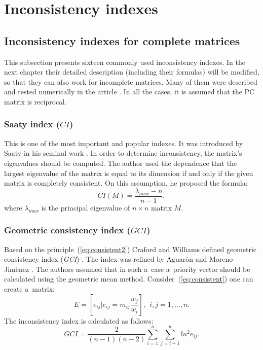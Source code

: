 \chapter{Inconsistency indexes}
\label{sec:inconsistencyIndexes}
\section{Inconsistency indexes for complete matrices}

This subsection presents sixteen commonly used inconsistency indexes. In the next chapter their detailed description (including their formulas) will be modified, so that they can also work for incomplete matrices. Many of them were described and tested numerically in the article \cite{Brunelli2013}. In all the cases, it is assumed that the PC matrix is reciprocal.


 \subsection{Saaty index ($\textit{CI}$)}

This is one of the most important and popular indexes. It was introduced by Saaty in his seminal work \cite{SAATY1977}. In order to determine inconsistency, the matrix's eigenvalues should be computed. The author used the dependence that the largest eigenvalue of the matrix is equal to its dimension if and only if the given matrix is completely consistent. On this assumption, he proposed the formula:
	\begin{equation} 
		CI(M)=\frac{\lambda_{max}-n}{n-1},
	 \end{equation}
 where $\lambda_{max}$
  is the principal eigenvalue of $n\times n$ matrix $M$.


\subsection{Geometric consistency index ($\textit{GCI}$)}

Based on the principle~(\ref{eq:consistent2}) Craford and Williams defined geometric consistency index (\textit{GCI}) \cite{CRAWFORD1985}. The index was refined by Aguaròn and Moreno-Jimènez \cite{AGUARON2003}. The authors assumed that in such a~case a~priority vector should be calculated using the geometric mean method. Consider~(\ref{eq:consistent}) one can create a~matrix:
	\begin{equation} 
		E=\left[e_{ij}\bigl\vert e_{ij}=m_{ij}\frac{w_{j}}{w_{i}}\right],~~i,j=1,...,n.
	 \end{equation}
 The inconsistency index is calculated as follows:
	 \begin{equation} 
		\label{eq:GCI}
		\textit{GCI}=\frac{2}{(n-1)(n-2)}\sum_{i=1}^{n}\sum_{j=i+1}^{n}ln^{2}e_{ij}.
	 \end{equation}

